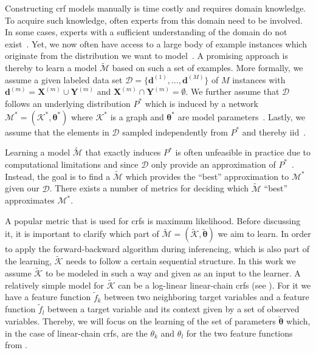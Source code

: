 Constructing \gls{crf} models manually is time costly and requires domain knowledge.
To acquire such knowledge, often experts from this domain need to be involved.
In some cases, experts with a sufficient understanding of the domain do not exist~\citep{koller2009probabilistic}.
Yet, we now often have access to a large body of example instances which originate from the distribution we want to model~\citep{koller2009probabilistic}.
A promising approach is thereby to learn a model $\mathcal{\tilde{M}}$ based on such a set of examples.
More formally, we assume a given labeled data set $\mathcal{D}=\{\mathbf{d}^{(1)},\dots,\mathbf{d}^{(M)}\}$ of $M$ instances with $\mathbf{d}^{(m)}=\mathbf{X}^{(m)}\cup\mathbf{Y}^{(m)}$ and $\mathbf{X}^{(m)}\cap\mathbf{Y}^{(m)}=\emptyset$.
We further assume that $\mathcal{D}$ follows an underlying distribution $P^*$ which is induced by a network $\mathcal{M}^*=(\mathcal{K}^*,\mathbf{\theta}^*)$ where $\mathcal{K}^*$ is a graph and $\mathbf{\theta}^*$ are model parameters~\citep{koller2009probabilistic}.
Lastly, we assume that the elements in $\mathcal{D}$ sampled independently from $P^*$ and thereby \acrfull{iid}~\citep{koller2009probabilistic}.

\bigskip

Learning a model $\mathcal{\tilde{M}}$ that exactly induces $P^*$ is often unfeasible in practice due to computational limitations and since $\mathcal{D}$ only provide an approximation of $P^*$~\citep{koller2009probabilistic}.
Instead, the goal is to find a $\mathcal{\tilde{M}}$ which provides the ``best'' approximation to $\mathcal{M}^*$ given our $\mathcal{D}$.
There exists a number of metrics for deciding which $\mathcal{\tilde{M}}$ ``best'' approximates $\mathcal{M}^*$.

A popular metric that is used for \glspl{crf} is \gls{maximum likelihood}.
Before discussing it, it is important to clarify which part of $\mathcal{\tilde{M}}=(\mathcal{\tilde{K}},\mathbf{\tilde{\theta}})$ we aim to learn.
In order to apply the forward-backward algorithm during inferencing, which is also part of the learning, $\mathcal{\tilde{K}}$ needs to follow a certain sequential structure.
In this work we assume $\mathcal{\tilde{K}}$ to be modeled in such a way and given as an input to the learner.
A relatively simple model for $\mathcal{\tilde{K}}$ can be a log-linear \glspl{linear-chain crf} (see ). For it we have a \gls{feature function} $\tilde{f}_k$ between two neighboring \glspl{target variable} and a \gls{feature function} $\tilde{f}_l$ between a \gls{target variable} and its context given by a set of \glspl{observed variable}.
Thereby, we will focus on the learning of the set of parameters $\mathbf{\tilde{\theta}}$ which, in the case of \glspl{linear-chain crf}, are the $\theta_k$ and $\theta_l$ for the two \glspl{feature function} from .

